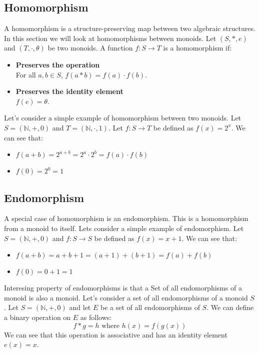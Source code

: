 \documentclass{article}
\begin{document}
\subsection{Homomorphism}
A homomorphism is a structure-preserving map between two algebraic structures.
In this section we will look at homomorphisms between monoids.
Let \( (S, \ast, e) \) and \( (T, \cdot, \theta) \) be two monoids.
A function \( f: S \to T \) is a homomorphism if:
\begin{itemize}
    \item \textbf{Preserves the operation} \\
    For all \( a, b \in S \), \( f(a \ast b) = f(a) \cdot f(b) \).
    \item \textbf{Preserves the identity element} \\
    \( f(e) = \theta \).
\end{itemize}
Let's consider a simple example of homomorphism between two monoids.
Let \( S = (\mathbb{N}, +, 0) \) and \( T = (\mathbb{N}, \cdot, 1) \).
Let \( f: S \to T \) be defined as \( f(x) = 2^x \).
We can see that:
\begin{itemize}
    \item \( f(a + b) = 2^{a + b} = 2^a \cdot 2^b = f(a) \cdot f(b) \)
    \item \( f(0) = 2^0 = 1 \)
\end{itemize}
\subsection{Endomorphism}
A special case of homomorphism is an endomorphism.
This is a homomorphism from a monoid to itself.
Lets consider a simple example of endomorphism.
Let \( S = (\mathbb{N}, +, 0) \) and \( f: S \to S \) be defined as \( f(x) = x + 1 \).
We can see that:
\begin{itemize}
    \item \( f(a + b) = a + b + 1 = (a + 1) + (b + 1) = f(a) + f(b) \)
    \item \( f(0) = 0 + 1 = 1 \)
\end{itemize}
Interesing property of endomorphisms is that a Set of all endomorphisms of a monoid is also a monoid.
Let's consider a set of all endomorphisms of a monoid \( S \).
Let \( S = (\mathbb{N}, +, 0) \) and let \( E \) be a set of all endomorphisms of \( S \).
We can define a binary operation on \( E \) as follows:
\begin{equation}
    f \ast g = h \text{ where } h(x) = f(g(x))
\end{equation}
We can see that this operation is associative and has an identity element \( e(x) = x \).
\end{document}
